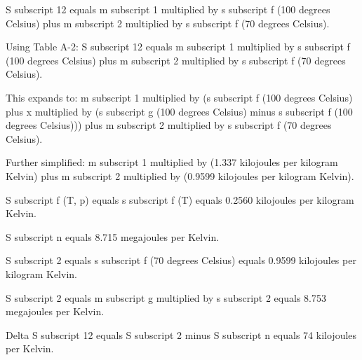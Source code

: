 S subscript 12 equals m subscript 1 multiplied by s subscript f (100 degrees Celsius) plus m subscript 2 multiplied by s subscript f (70 degrees Celsius).  

Using Table A-2:  
S subscript 12 equals m subscript 1 multiplied by s subscript f (100 degrees Celsius) plus m subscript 2 multiplied by s subscript f (70 degrees Celsius).  

This expands to:  
m subscript 1 multiplied by (s subscript f (100 degrees Celsius) plus x multiplied by (s subscript g (100 degrees Celsius) minus s subscript f (100 degrees Celsius))) plus m subscript 2 multiplied by s subscript f (70 degrees Celsius).  

Further simplified:  
m subscript 1 multiplied by (1.337 kilojoules per kilogram Kelvin) plus m subscript 2 multiplied by (0.9599 kilojoules per kilogram Kelvin).  

S subscript f (T, p) equals s subscript f (T) equals 0.2560 kilojoules per kilogram Kelvin.  

S subscript n equals 8.715 megajoules per Kelvin.  

S subscript 2 equals s subscript f (70 degrees Celsius) equals 0.9599 kilojoules per kilogram Kelvin.  

S subscript 2 equals m subscript g multiplied by s subscript 2 equals 8.753 megajoules per Kelvin.  

Delta S subscript 12 equals S subscript 2 minus S subscript n equals 74 kilojoules per Kelvin.
